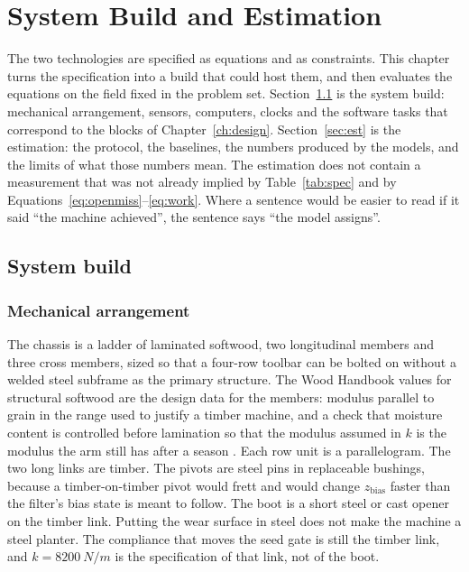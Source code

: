 \chapter{System Build and Estimation}
\label{ch:estimate}

The two technologies are specified as equations and as constraints. This chapter turns the specification into a build that could host them, and then evaluates the equations on the field fixed in the problem set. Section~\ref{sec:build} is the system build: mechanical arrangement, sensors, computers, clocks and the software tasks that correspond to the blocks of Chapter~\ref{ch:design}. Section~\ref{sec:est} is the estimation: the protocol, the baselines, the numbers produced by the models, and the limits of what those numbers mean. The estimation does not contain a measurement that was not already implied by Table~\ref{tab:spec} and by Equations~\eqref{eq:openmiss}--\eqref{eq:work}. Where a sentence would be easier to read if it said ``the machine achieved'', the sentence says ``the model assigns''.

\section{System build}
\label{sec:build}

\subsection{Mechanical arrangement}

The chassis is a ladder of laminated softwood, two longitudinal members and three cross members, sized so that a four-row toolbar can be bolted on without a welded steel subframe as the primary structure. The Wood Handbook values for structural softwood are the design data for the members: modulus parallel to grain in the range used to justify a timber machine, and a check that moisture content is controlled before lamination so that the modulus assumed in \(k\) is the modulus the arm still has after a season \cite{woodhandbook}. Each row unit is a parallelogram. The two long links are timber. The pivots are steel pins in replaceable bushings, because a timber-on-timber pivot would frett and would change \(z_{\mathrm{bias}}\) faster than the filter's bias state is meant to follow. The boot is a short steel or cast opener on the timber link. Putting the wear surface in steel does not make the machine a steel planter. The compliance that moves the seed gate is still the timber link, and \(k=\SI{8200}{N/m}\) is the specification of that link, not of the boot.

